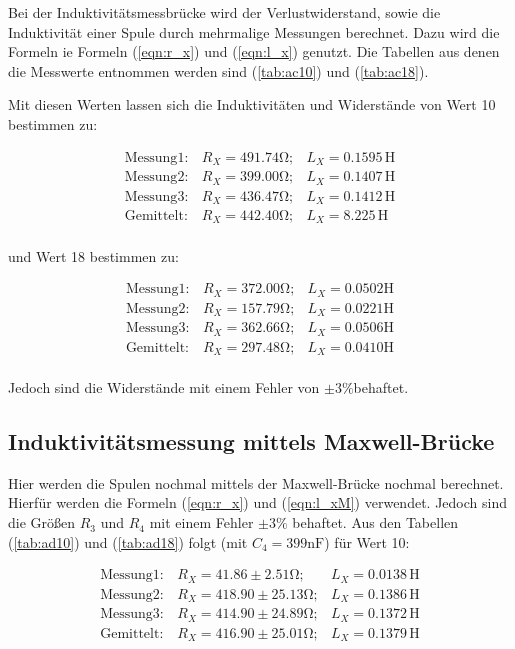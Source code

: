 Bei der Induktivitätsmessbrücke wird der Verlustwiderstand, sowie die Induktivität einer Spule durch mehrmalige Messungen berechnet. Dazu wird die Formeln ie Formeln (\ref{eqn:r_x}) 
und (\ref{eqn:l_x}) genutzt. Die Tabellen aus denen die Messwerte entnommen werden sind (\ref{tab:ac10}) und (\ref{tab:ac18}).

Mit diesen Werten lassen sich die Induktivitäten und Widerstände von Wert 10 bestimmen zu:

\begin{align*}
\text{Messung}1:& R_X = 491.74 \si{\ohm};& L_X =  0.1595 \,  \si{\henry}\\
\text{Messung}2:& R_X = 399.00 \si{\ohm};& L_X =  0.1407 \,   \si{\henry}\\
\text{Messung}3:& R_X = 436.47 \si{\ohm};& L_X =  0.1412 \,    \si{\henry}\\
\text{Gemittelt}:& R_X= 442.40 \si{\ohm};& L_X = 8.225   \, \si{\henry}\\
\end{align*}

und Wert 18 bestimmen zu:

\begin{align*}
\text{Messung}1:& R_X = 372.00 \si{\ohm};& L_X =  0.0502 \si{\henry}\\
\text{Messung}2:& R_X = 157.79 \si{\ohm};& L_X =  0.0221 \si{\henry}\\
\text{Messung}3:& R_X = 362.66 \si{\ohm};& L_X =  0.0506 \si{\henry}\\
\text{Gemittelt}:& R_X=297.48 \si{\ohm};&  L_X =  0.0410 \si{\henry}\\
\end{align*}

Jedoch sind die Widerstände mit einem Fehler von $\pm 3\% $behaftet.


\subsection{Induktivitätsmessung mittels Maxwell-Brücke}

Hier werden die Spulen nochmal mittels der Maxwell-Brücke nochmal berechnet. Hierfür werden die Formeln  (\ref{eqn:r_x}) und (\ref{eqn:l_xM}) verwendet.
Jedoch sind die Größen $R_3$ und $R_4$ mit einem Fehler $\pm 3\%$ behaftet. Aus den Tabellen (\ref{tab:ad10}) und (\ref{tab:ad18}) folgt (mit $C_4 = 399 \si{\nano\farad} $) für Wert 10:

\begin{align*}
\text{Messung}1:& R_X =  41.86 \pm 2.51  \si{\ohm};& L_X =  0.0138 \, \si{\henry}\\
\text{Messung}2:& R_X = 418.90 \pm 25.13 \si{\ohm};& L_X =  0.1386 \, \si{\henry}\\
\text{Messung}3:& R_X = 414.90 \pm 24.89 \si{\ohm};& L_X =  0.1372 \, \si{\henry}\\
\text{Gemittelt}:& R_X= 416.90 \pm 25.01 \si{\ohm};& L_X =  0.1379 \, \si{\henry}\\ 
\end{align*}

